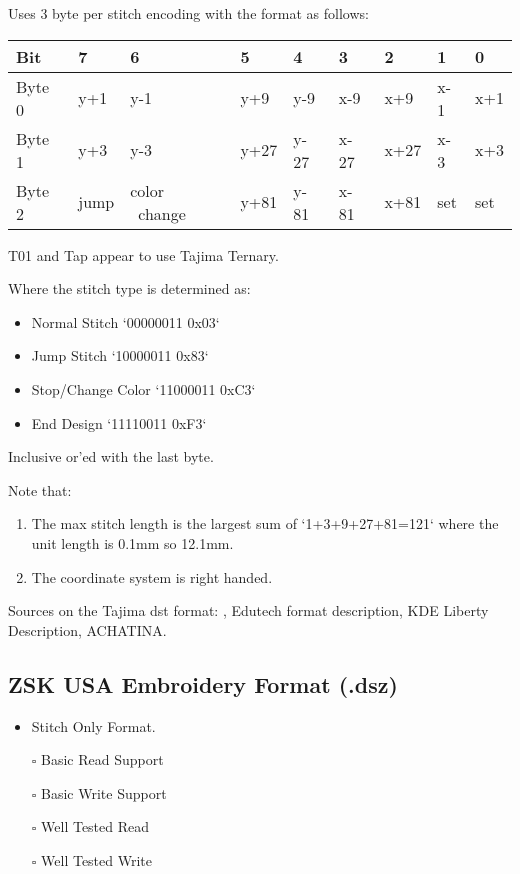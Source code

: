 \documentclass[onesize, a4paper]{refart}
\providecommand{\tightlist}{\setlength{\itemsep}{0pt}\setlength{\parskip}{0pt}}
\begin{document}
Uses 3 byte per stitch encoding with the format as follows:

\begin{tabularx}{\linewidth}{X@{}X@{}X@{}X@{}X@{}X@{}X@{}X@{}X@{}}
\caption{The 3 byte encoding for the dxf format.}\\
\toprule
\textbf{Bit} & \textbf{7} & \textbf{6} & \textbf{5} & \textbf{4} & \textbf{3} & \textbf{2} & \textbf{1} & \textbf{0} \\
\midrule
\endhead
Byte 0 & y+1 & y-1 & y+9 & y-9 & x-9 & x+9 & x-1 & x+1 \\
Byte 1 & y+3 & y-3 & y+27 & y-27 & x-27 & x+27 & x-3 & x+3 \\
Byte 2 & jump & color \break\ change & y+81 & y-81 & x-81 & x+81 & set & set \\
\end{tabularx}

T01 and Tap appear to use Tajima Ternary.
 
Where the stitch type is determined as:

\begin{itemize}
\item Normal Stitch `00000011 0x03`
\item Jump Stitch `10000011 0x83`
\item Stop/Change Color `11000011 0xC3`
\item End Design `11110011 0xF3`
\end{itemize}

Inclusive or'ed with the last byte.

Note that:

\begin{enumerate}
\item The max stitch length is the largest sum of `1+3+9+27+81=121` where the unit length is 0.1mm so 12.1mm.
\item The coordinate system is right handed.
\end{enumerate}

Sources on the Tajima dst format: \cite{fineEmbStudio2021},
Edutech format description\cite{eduTechWikiDST},
KDE Liberty Description\cite{libertyTajima}, ACHATINA\cite{achatina}.

\subsection{ZSK USA Embroidery Format (.dsz)}

\begin{itemize}
\tightlist
\item Stitch Only Format.
\item[$\square$] Basic Read Support
\item[$\square$] Basic Write Support
\item[$\square$] Well Tested Read
\item[$\square$] Well Tested Write
\end{itemize}
\end{document}
